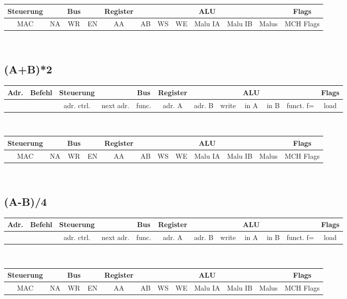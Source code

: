 \documentclass[paper=a4, fontsize=11pt]{scrartcl}
\numberwithin{equation}{section}
\numberwithin{figure}{section}
\numberwithin{table}{section}
\begin{document}
\begin{tabular}{|cc|cc|cccc|ccc|c|}
\hline
Steuerung & & Bus & & Register & & & & ALU & & & Flags \\
\hline
MAC & NA & WR & EN & AA & AB & WS & WE & Malu IA & Malu IB & Malus & MCH Flags \\
\hline
\end{tabular} \\


\subsection{(A+B)*2}

\begin{tabular}{|c|c|cc|c|ccc|ccc|c|}
\hline
Adr. & Befehl &Steuerung & & Bus & Register & & & ALU & & & Flags \\
\hline
& & adr. ctrl. & next adr. & func. & adr. A & adr. B & write & in A & in B & funct. f= & load \\
\hline
\end{tabular} \\

\begin{tabular}{|cc|cc|cccc|ccc|c|}
\hline
Steuerung & & Bus & & Register & & & & ALU & & & Flags \\
\hline
MAC & NA & WR & EN & AA & AB & WS & WE & Malu IA & Malu IB & Malus & MCH Flags \\
\hline
\end{tabular} \\


\subsection{(A-B)/4}

\begin{tabular}{|c|c|cc|c|ccc|ccc|c|}
\hline
Adr. & Befehl &Steuerung & & Bus & Register & & & ALU & & & Flags \\
\hline
& & adr. ctrl. & next adr. & func. & adr. A & adr. B & write & in A & in B & funct. f= & load \\
\hline
\end{tabular} \\

\begin{tabular}{|cc|cc|cccc|ccc|c|}
\hline
Steuerung & & Bus & & Register & & & & ALU & & & Flags \\
\hline
MAC & NA & WR & EN & AA & AB & WS & WE & Malu IA & Malu IB & Malus & MCH Flags \\
\hline
\end{tabular} \\
\end{document}
